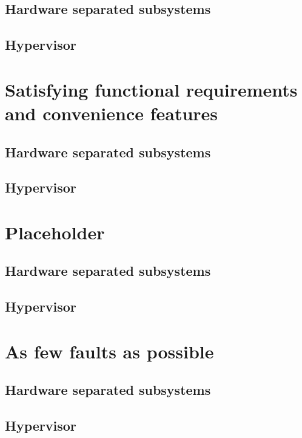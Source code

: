     
\subsection{Hardware separated subsystems}
\subsection{Hypervisor}


\section{Satisfying functional requirements and convenience features}
\subsection{Hardware separated subsystems}
\subsection{Hypervisor}


\section{Placeholder}
\subsection{Hardware separated subsystems}
\subsection{Hypervisor}


\section{As few faults as possible}
\subsection{Hardware separated subsystems}
\subsection{Hypervisor}

